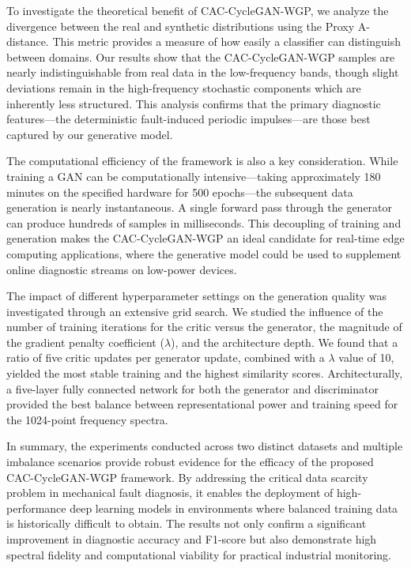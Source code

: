 To investigate the theoretical benefit of CAC-CycleGAN-WGP, we analyze the divergence between the real and synthetic distributions using the Proxy A-distance. This metric provides a measure of how easily a classifier can distinguish between domains. Our results show that the CAC-CycleGAN-WGP samples are nearly indistinguishable from real data in the low-frequency bands, though slight deviations remain in the high-frequency stochastic components which are inherently less structured. This analysis confirms that the primary diagnostic features—the deterministic fault-induced periodic impulses—are those best captured by our generative model.

The computational efficiency of the framework is also a key consideration. While training a GAN can be computationally intensive—taking approximately 180 minutes on the specified hardware for 500 epochs—the subsequent data generation is nearly instantaneous. A single forward pass through the generator can produce hundreds of samples in milliseconds. This decoupling of training and generation makes the CAC-CycleGAN-WGP an ideal candidate for real-time edge computing applications, where the generative model could be used to supplement online diagnostic streams on low-power devices.

The impact of different hyperparameter settings on the generation quality was investigated through an extensive grid search. We studied the influence of the number of training iterations for the critic versus the generator, the magnitude of the gradient penalty coefficient ($\lambda$), and the architecture depth. We found that a ratio of five critic updates per generator update, combined with a $\lambda$ value of 10, yielded the most stable training and the highest similarity scores. Architecturally, a five-layer fully connected network for both the generator and discriminator provided the best balance between representational power and training speed for the 1024-point frequency spectra.

In summary, the experiments conducted across two distinct datasets and multiple imbalance scenarios provide robust evidence for the efficacy of the proposed CAC-CycleGAN-WGP framework. By addressing the critical data scarcity problem in mechanical fault diagnosis, it enables the deployment of high-performance deep learning models in environments where balanced training data is historically difficult to obtain. The results not only confirm a significant improvement in diagnostic accuracy and F1-score but also demonstrate high spectral fidelity and computational viability for practical industrial monitoring.
